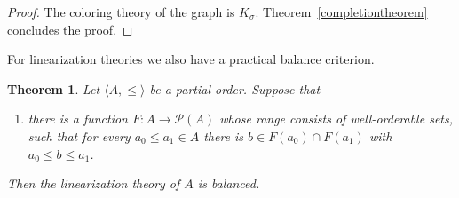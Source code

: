 \documentclass{article}
\newcommand{\gs}{\sigma}
\newcommand{\power}{\mathcal{P}}
\newtheorem{theorem}{Theorem}[section]
\theoremstyle{definition}
\begin{document}
\begin{proof}
	The coloring theory of the graph is $K_\gs$. Theorem~\ref{completiontheorem} concludes the proof.
\end{proof}


\noindent For linearization theories we also have a practical balance criterion.

\begin{theorem}
\label{linearizationtheorem}
Let $\langle A, \leq\rangle$ be a partial order. Suppose that 

\begin{enumerate}
\item[(*)] there is a function $F\colon A\to\power(A)$ whose range consists of well-orderable sets, such that for every $a_0\leq a_1\in A$ there is $b\in F(a_0)\cap F(a_1)$ with $a_0\leq b\leq a_1$.
\end{enumerate}

\noindent Then the linearization theory of $A$ is balanced.
\end{theorem}
\end{document}
